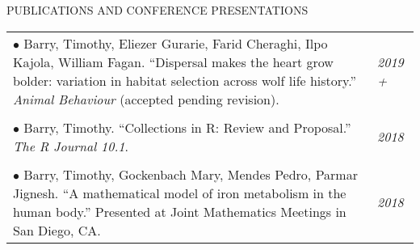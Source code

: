 \documentclass{resume} %
\begin{document}
\newpage

\begin{rSection}{PUBLICATIONS AND CONFERENCE PRESENTATIONS}
	
\begin{tabular}{p{14cm}R{2.5cm}}
	$\bullet$ Barry, Timothy, Eliezer Gurarie, Farid Cheraghi, Ilpo Kajola, William Fagan. ``Dispersal makes the heart grow bolder: variation in habitat selection across wolf life history.'' \textit{Animal Behaviour} (accepted pending revision). & \textit{2019 +} \\ & \\
	$\bullet$ Barry, Timothy. ``Collections in R: Review and Proposal.'' \textit{The R Journal 10.1}. & \textit{2018} \\ & \\ $\bullet$ Barry, Timothy, Gockenbach Mary, Mendes Pedro, Parmar Jignesh. ``A mathematical model of iron metabolism in the human body.'' Presented at Joint Mathematics Meetings in San Diego, CA. & \textit{2018}
\end{tabular} 
	
\end{rSection}





\end{document}
